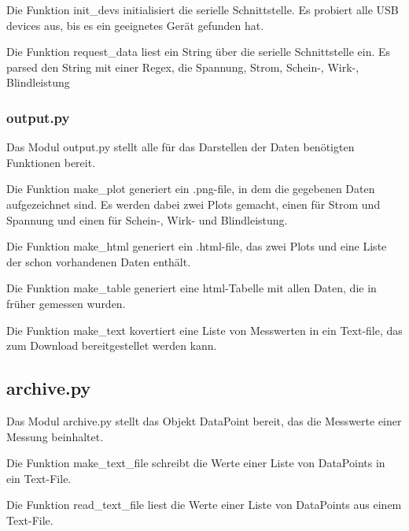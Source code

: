 \documentclass{article}
\begin{document}
Die Funktion init\_devs initialisiert die serielle Schnittstelle.
Es probiert alle USB devices aus, bis es ein geeignetes Gerät gefunden hat.

Die Funktion request\_data liest ein String über die serielle Schnittstelle ein.
Es parsed den String mit einer Regex, die Spannung, Strom, Schein-, Wirk-, Blindleistung 

\subsubsection{output.py}
Das Modul output.py stellt alle für das Darstellen der Daten benötigten Funktionen bereit.

Die Funktion make\_plot generiert ein .png-file, in dem die gegebenen Daten aufgezeichnet sind.
Es werden dabei zwei Plots gemacht, einen für Strom und Spannung und einen für Schein-, Wirk- und Blindleistung.

Die Funktion make\_html generiert ein .html-file, das zwei Plots und eine Liste der schon vorhandenen Daten enthält.

Die Funktion make\_table generiert eine html-Tabelle mit allen Daten, die in früher gemessen wurden.

Die Funktion make\_text kovertiert eine Liste von Messwerten in ein Text-file, das zum Download bereitgestellet werden kann.

\subsection{archive.py}
Das Modul archive.py stellt das Objekt DataPoint bereit, das die Messwerte einer Messung beinhaltet.

Die Funktion make\_text\_file schreibt die Werte einer Liste von DataPoints in ein Text-File.

Die Funktion read\_text\_file liest die Werte einer Liste von DataPoints aus einem Text-File.
\end{document}
